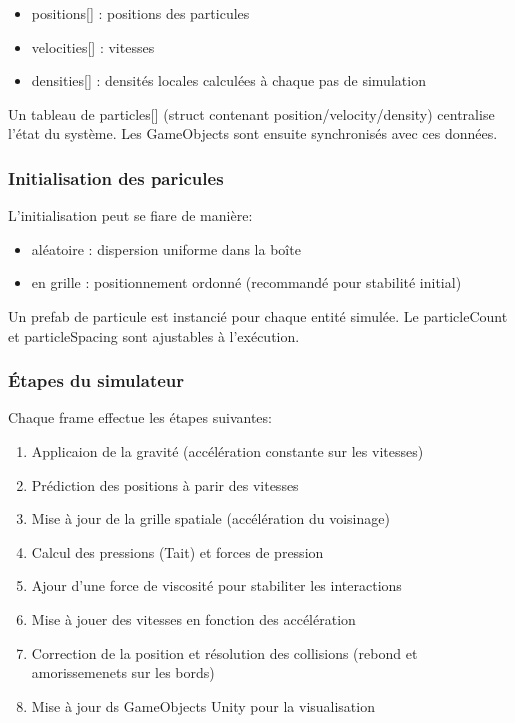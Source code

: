 \documentclass{article}
\begin{document}
\begin{itemize}
    \item positions[] : positions des particules
    \item velocities[] : vitesses
    \item densities[] : densités locales calculées à chaque pas de simulation 
\end{itemize}

Un tableau de particles[] (struct contenant position/velocity/density) centralise l’état du système. Les GameObjects sont ensuite synchronisés avec ces données.

\subsubsection{Initialisation des paricules}

L'initialisation peut se fiare de manière: 

\begin{itemize}
    \item aléatoire : dispersion uniforme dans la boîte
    \item en grille : positionnement ordonné (recommandé pour stabilité initial)
\end{itemize}

Un prefab de particule est instancié pour chaque entité simulée. Le particleCount et particleSpacing sont ajustables à l’exécution.

\subsubsection{Étapes du simulateur}

Chaque frame effectue les étapes suivantes:

\begin{enumerate}
    \item Applicaion de la gravité (accélération constante sur les vitesses)
    \item Prédiction des positions à parir des vitesses
    \item Mise à jour de la grille spatiale (accélération du voisinage)
    \item Calcul des pressions (Tait) et forces de pression
    \item Ajour d'une force de viscosité pour stabiliter les interactions
    \item Mise à jouer des vitesses en fonction des accélération
    \item Correction de la position et résolution des collisions (rebond et amorissemenets sur les bords)
    \item Mise à jour ds GameObjects Unity pour la visualisation
\end{enumerate}
\end{document}
